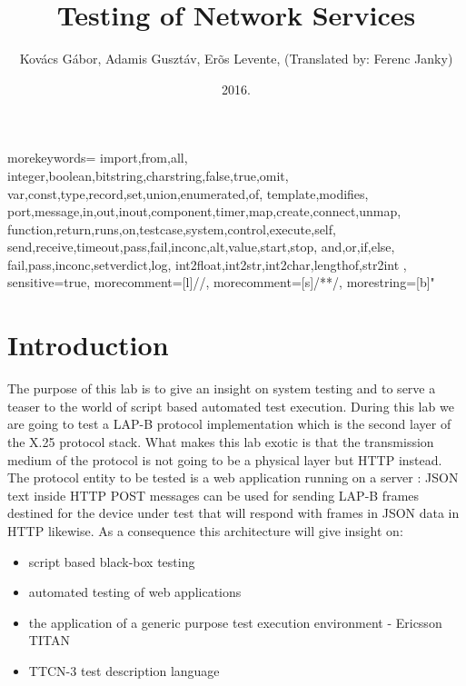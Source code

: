 \documentclass[a4paper]{article}
\title{Testing of Network Services}
\author{Kovács Gábor, Adamis Gusztáv, Erõs Levente, (Translated by: Ferenc Janky)}
\date{2016.}
\begin{document}
{
    morekeywords={
            import,from,all,
            integer,boolean,bitstring,charstring,false,true,omit,
            var,const,type,record,set,union,enumerated,of,
            template,modifies,
            port,message,in,out,inout,component,timer,map,create,connect,unmap,
            function,return,runs,on,testcase,system,control,execute,self,
            send,receive,timeout,pass,fail,inconc,alt,value,start,stop,
            and,or,if,else,
            fail,pass,inconc,setverdict,log,
            int2float,int2str,int2char,lengthof,str2int
        },
    sensitive=true, %
    morecomment=[l]{//}, %
    morecomment=[s]{/*}{*/}, %
    morestring=[b]" %
}
\lstset{language=TTCN3}
\lstset{frame=single}
\lstset{breaklines=true}

\maketitle

\tableofcontents

\section{Introduction}

The purpose of this lab is to give an insight on system testing and to serve a teaser to the world of script based
automated
test execution. During this lab we are going to test a LAP-B protocol implementation which is the second layer of the
X.25 protocol
stack. What makes this lab exotic is that the transmission medium of the protocol is not going to be a physical layer
but HTTP instead. The protocol entity to be tested is a web application running on a server : JSON text inside HTTP
POST messages can be used for sending LAP-B frames destined for the device under test that will respond with frames in
JSON data in HTTP likewise. As a consequence this architecture will give insight on:
\begin{itemize}
    \item script based black-box testing
    \item automated testing of web applications
    \item the application of a generic purpose test execution environment - Ericsson TITAN
    \item TTCN-3 test description language
\end{itemize}
\end{document}
